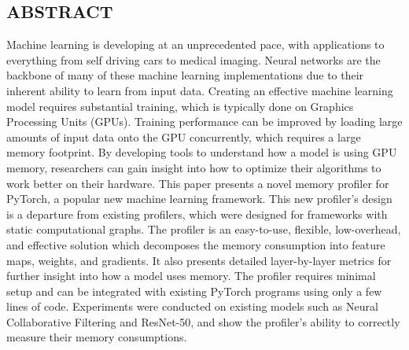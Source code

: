 \documentclass[12pt,letterpaper]{article}
\begin{document}
\thispagestyle{empty}

\clearpage
\setcounter{page}{1}
\vspace*{\fill}
\begin{singlespace}
\begin{center}
\section*{ABSTRACT}
\end{center}
Machine learning is developing at an unprecedented pace, with applications to everything from self driving cars to medical imaging. Neural networks are the backbone of many of these machine learning implementations due to their inherent ability to learn from input data. Creating an effective machine learning model requires substantial training, which is typically done on Graphics Processing Units (GPUs). Training performance can be improved by loading large amounts of input data onto the GPU concurrently, which requires a large memory footprint. By developing tools to understand how a model is using GPU memory, researchers can gain insight into how to optimize their algorithms to work better on their hardware. This paper presents a novel memory profiler for PyTorch, a popular new machine learning framework. This new profiler's design is a departure from existing profilers, which were designed for frameworks with static computational graphs. The  profiler is an easy-to-use, flexible, low-overhead, and effective solution which decomposes the memory consumption into feature maps, weights, and gradients. It also presents detailed layer-by-layer metrics for further insight into how a model uses memory. The profiler requires minimal setup and can be integrated with existing PyTorch programs using only a few lines of code. Experiments were conducted on existing models such as Neural Collaborative Filtering and ResNet-50, and show the profiler's ability to correctly measure their memory consumptions.
\end{singlespace}
\vspace*{\fill}
\newpage 
\end{document}
